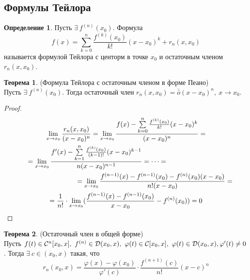 \documentclass[a4paper, 12pt]{article}
\renewcommand{\phi}{\varphi}
\newcommand\tab[1][.5cm]{\hspace*{#1}}
\theoremstyle{definition}
\newtheorem*{definition}{Определение}
\newtheorem*{theorem}{Теорема}
\begin{document}
        \subsection{Формулы Тейлора}
        \begin{definition}
            Пусть $\exists\ f^{(n)}(x_0)$. Формула
            \[f(x)=\sum\limits_{k=0}^{n}\frac{f^{(k)}(x_0)}{k!}(x-x_0)^k+r_n(x,x_0)\]
            называется формулой Тейлора с центорм в точке $x_0$ и остаточным членом $r_n(x,x_0)$.
        \end{definition} 
        \begin{theorem} (Формула Тейлора с остаточным членом в форме Пеано)\\
            Пусть $\exists\ f^{(n)}(x_0)$. Тогда остаточный член $r_n(x,x_0)=\bar{\bar{o}}{(x-x_0)^n},\ x\to x_0$.
        \end{theorem} 
        \begin{proof}
            \begin{multline*}
                \lim\limits_{x\to x_0}\frac{r_n(x,x_0)}{(x-x_0)^n}=\lim\limits_{x\to x_0}\frac{f(x)-\sum\limits_{k=0}^{n}\frac{f^{(k)}(x_0)}{k!}(x-x_0)^k}{(x-x_0)^n}=\\
                =\lim\limits_{x\to x_0}\frac{f'(x)-\sum\limits_{k=1}^{n}\frac{f^{(k)}(x_0)}{(k-1)!}(x-x_0)^{k-1}}{n(x-x_0)^{n-1}}=\dots=\tab[3cm]\\
                \tab[3cm]=\lim\limits_{x\to x_0}\frac{f^{(n-1)}(x)-f^{(n-1)}(x_0)-f^{(n)}(x_0)(x-x_0)}{n!(x-x_0)}=\\
                =\frac{1}{n!}\cdot \lim\limits_{x\to x_0}(\frac{f^{(n-1)}(x)-f^{(n-1)}(x_0)}{x-x_0}-f^{(n)}(x_0))=0
            \end{multline*}
        \end{proof} 
        \begin{theorem} (Остаточный член в общей форме)\\
            Пусть $f(t)\in \mathcal{C}^n[x_0,x],\ f^{(n)}\in \mathcal{D}(x_0,x),\ \phi(t)\in \mathcal{C}[x_0,x],\ \phi(t)\in \mathcal{D}(x_0,x),\\
            \phi'(t)\ne 0$. Тогда $\exists\ c\in (x_0,x)$ такая, что 
            \[r_n(x_0,x)= \frac{\phi(x)-\phi(x_0)}{\phi'(c)}\cdot \frac{f^{(n+1)}(c)}{n!}(x-c)^n\]
        \end{theorem} 
\end{document}
